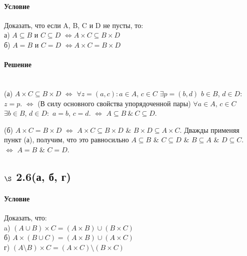 \documentclass[a4paper,12pt]{article}
\begin{document}
\paragraph*{Условие}
Доказать, что если A, B, C и D не пусты, то:\\
а) $A \subseteq B$ и $ C \subseteq D $ $\Leftrightarrow A \times C \subseteq B \times D$\\
б) $A = B$ и $ C = D $ $\Leftrightarrow A \times C = B \times D$
\paragraph*{Решение} \mbox{}\\
(а) $A\times C \subseteq B\times D$ $\Leftrightarrow$ $\forall z=(a,c): a\in A$, $c\in C$ $\exists p=(b,d)$ $b\in B$, $d\in D:$ $z=p$. $\Leftrightarrow$ (В силу основного свойства упорядоченной пары) $\forall a\in A$, $c\in C$ $\exists b\in B$, $d\in D:$ $a=b$, $c=d$. $\Leftrightarrow$ $A \subseteq B \ \& \ C\subseteq D$.

\medskip

(б) $A\times C = B\times D$ $\Leftrightarrow$ $A\times C \subseteq B\times D$ $\&$ $B\times D \subseteq A\times C$. Дважды применяя пункт (а), получим, что это равносильно $A\subseteq B$ $\&$ $C\subseteq D$ $\&$ $B \subseteq A$ $\&$ $D\subseteq C$. $\Leftrightarrow$ $A=B$ $\&$ $C=D$.

\subsection*{$\S$ 2.6(а, б, г)}
\paragraph*{Условие}
Доказать, что:\\
a) $ ( A \cup B ) \times C = ( A \times B ) \cup ( B \times C ) $\\
б) $ A \times ( B \cup C ) = ( A \times B ) \cup ( A \times C ) $\\
г) $ ( A \setminus B ) \times C = ( A \times C ) \setminus ( B \times C ) $
\end{document}
